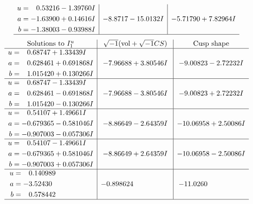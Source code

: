 \documentclass[1p]{elsarticle_modified}
\theoremstyle{definition}
\newcommand{\I}{\sqrt{-1}}
\begin{document}
$$\begin{array}{c|c|c}
\begin{aligned}
u &= \phantom{-}0.53216 - 1.39760 I \\
a &= -1.63900 + 0.14616 I \\
b &= -1.38003 - 0.93988 I\end{aligned}
 & -8.8717 - 15.0132 I & -5.71790 + 7.82964 I\\
 \hline 
 \end{array}$$\newpage$$\begin{array}{c|c|c}  
\text{Solutions to }I^u_{1}& \I (\text{vol} + \sqrt{-1}CS) & \text{Cusp shape}\\
 \hline 
\begin{aligned}
u &= \phantom{-}0.68747 + 1.33439 I \\
a &= \phantom{-}0.628461 + 0.691868 I \\
b &= \phantom{-}1.015420 + 0.130266 I\end{aligned}
 & -7.96688 + 3.80546 I & -9.00823 - 2.72232 I \\ \hline\begin{aligned}
u &= \phantom{-}0.68747 - 1.33439 I \\
a &= \phantom{-}0.628461 - 0.691868 I \\
b &= \phantom{-}1.015420 - 0.130266 I\end{aligned}
 & -7.96688 - 3.80546 I & -9.00823 + 2.72232 I \\ \hline\begin{aligned}
u &= \phantom{-}0.54107 + 1.49661 I \\
a &= -0.679365 - 0.581046 I \\
b &= -0.907003 - 0.057306 I\end{aligned}
 & -8.86649 - 2.64359 I & -10.06958 + 2.50086 I \\ \hline\begin{aligned}
u &= \phantom{-}0.54107 - 1.49661 I \\
a &= -0.679365 + 0.581046 I \\
b &= -0.907003 + 0.057306 I\end{aligned}
 & -8.86649 + 2.64359 I & -10.06958 - 2.50086 I \\ \hline\begin{aligned}
u &= \phantom{-}0.140989\phantom{ +0.000000I} \\
a &= -3.52430\phantom{ +0.000000I} \\
b &= \phantom{-}0.578442\phantom{ +0.000000I}\end{aligned}
 & -0.898624\phantom{ +0.000000I} & -11.0260\phantom{ +0.000000I}\\
 \hline 
 \end{array}$$\newpage\newpage\renewcommand{\arraystretch}{1}
\end{document}
